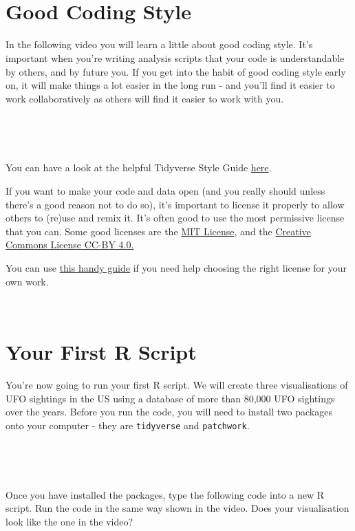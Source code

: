 \documentclass[
]{book}
\begin{document}
~~

~~

\hypertarget{good-coding-style}{%
\section{Good Coding Style}\label{good-coding-style}}

In the following video you will learn a little about good coding style. It's important when you're writing analysis scripts that your code is understandable by others, and by future you. If you get into the habit of good coding style early on, it will make things a lot easier in the long run - and you'll find it easier to work collaboratively as others will find it easier to work with you.

~~

~~

You can have a look at the helpful Tidyverse Style Guide \href{https://style.tidyverse.org}{here}.

If you want to make your code and data open (and you really should unless there's a good reason not to do so), it's important to license it properly to allow others to (re)use and remix it. It's often good to use the most permissive license that you can. Some good licenses are the \href{https://opensource.org/licenses/MIT}{MIT License}, and the \href{https://creativecommons.org/licenses/by/4.0/}{Creative Commons License CC-BY 4.0.}

You can use \href{https://choosealicense.com}{this handy guide} if you need help choosing the right license for your own work.

~~

\hypertarget{your-first-r-script}{%
\section{Your First R Script}\label{your-first-r-script}}

You're now going to run your first R script. We will create three visualisations of UFO sightings in the US using a database of more than 80,000 UFO sightings over the years. Before you run the code, you will need to install two packages onto your computer - they are \texttt{tidyverse} and \texttt{patchwork}.

~~

~~

Once you have installed the packages, type the following code into a new R script. Run the code in the same way shown in the video. Does your visualisation look like the one in the video?
\end{document}
